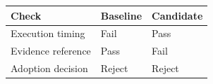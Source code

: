 \begin{tabular}{@{}P{3.7cm}P{4.3cm}P{4.3cm}@{}}
\toprule
\textbf{Check} & \textbf{Baseline} & \textbf{Candidate} \\
\midrule
Execution timing & Fail & Pass \\
Evidence reference & Pass & Fail \\
Adoption decision & Reject & Reject \\
\bottomrule
\end{tabular}
